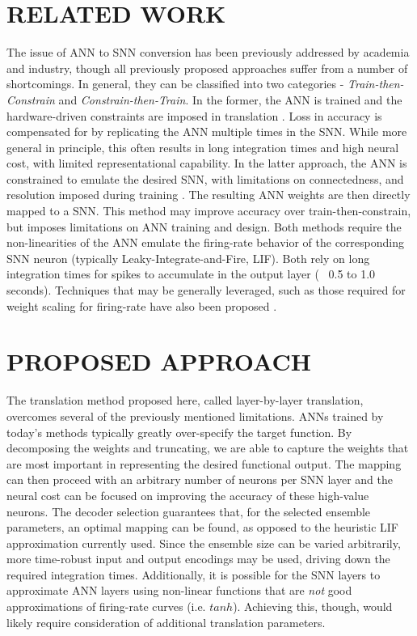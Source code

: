\documentclass[letterpaper, 10 pt, conference]{ieeeconf}  %
\begin{document}
\section{RELATED WORK}
The issue of ANN to SNN conversion has been previously addressed by academia and industry, though all previously proposed approaches suffer from a number of shortcomings. In general, they can be classified into two categories - \textit{Train-then-Constrain} and \textit{Constrain-then-Train}. In the former, the ANN is trained and the hardware-driven constraints are imposed in translation \cite{2016arXiv160104183D}. Loss in accuracy is compensated for by replicating the ANN multiple times in the SNN. While more general in principle, this often results in long integration times and high neural cost, with limited representational capability. In the latter approach, the ANN is constrained to emulate the desired SNN, with limitations on connectedness, and resolution imposed during training \cite{DBLP:journals/corr/HunsbergerE16} \cite{NIPS2015_5862}. The resulting ANN weights are then directly mapped to a SNN. This method may improve accuracy over train-then-constrain, but imposes limitations on ANN training and design. Both methods require the non-linearities of the ANN emulate the firing-rate behavior of the corresponding SNN neuron (typically Leaky-Integrate-and-Fire, LIF). Both rely on long integration times for spikes to accumulate in the output layer (~ 0.5 to 1.0 seconds). Techniques that may be generally leveraged, such as those required for weight scaling for firing-rate have also been proposed \cite{7280696}. 

\section{PROPOSED APPROACH}
The translation method proposed here, called layer-by-layer translation, overcomes several of the previously mentioned limitations. ANNs trained by today's methods typically greatly over-specify the target function. By decomposing the weights and truncating, we are able to capture the weights that are most important in representing the desired functional output. The mapping can then proceed with an arbitrary number of neurons per SNN layer and the neural cost can be focused on improving the accuracy of these high-value neurons. The decoder selection guarantees that, for the selected ensemble parameters, an optimal mapping can be found, as opposed to the heuristic LIF approximation currently used. Since the ensemble size can be varied arbitrarily, more time-robust input and output encodings may be used, driving down the required integration times. Additionally, it is possible for the SNN layers to approximate ANN layers using non-linear functions that are \textit{not} good approximations of firing-rate curves (i.e. $tanh$). Achieving this, though, would likely require consideration of additional translation parameters. 
\end{document}
